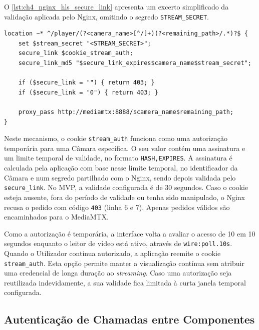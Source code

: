 O \autoref{lst:ch4_nginx_hls_secure_link} apresenta um excerto simplificado da validação aplicada pelo Nginx, omitindo o segredo \texttt{STREAM\_SECRET}.

\par\noindent\begin{minipage}{\linewidth}
\begin{lstlisting}[caption={Validação simplificada do acesso HLS no Nginx (nginx)},label={lst:ch4_nginx_hls_secure_link}]
location ~* ^/player/(?<camera_name>[^/]+)(?<remaining_path>/.*)?$ {
    set $stream_secret "<STREAM_SECRET>";
    secure_link $cookie_stream_auth;
    secure_link_md5 "$secure_link_expires$camera_name$stream_secret";

    if ($secure_link = "") { return 403; }
    if ($secure_link = "0") { return 403; }

    proxy_pass http://mediamtx:8888/$camera_name$remaining_path;
}
\end{lstlisting}
\end{minipage}

Neste mecanismo, o cookie \texttt{stream\_auth} funciona como uma autorização temporária para uma Câmara específica. O seu valor contém uma assinatura e um limite temporal de validade, no formato \texttt{HASH,EXPIRES}. A assinatura é calculada pela aplicação com base nesse limite temporal, no identificador da Câmara e num segredo partilhado com o Nginx, sendo depois validada pelo \texttt{secure\_link}. No \gls{MVP}, a validade configurada é de 30 segundos. Caso o cookie esteja ausente, fora do período de validade ou tenha sido manipulado, o Nginx recusa o pedido com código \texttt{403} (linha 6 e 7). Apenas pedidos válidos são encaminhados para o MediaMTX.

Como a autorização é temporária, a interface volta a avaliar o acesso de 10 em 10 segundos enquanto o leitor de vídeo está ativo, através de \texttt{wire:poll.10s}. Quando o Utilizador continua autorizado, a aplicação reemite o cookie \texttt{stream\_auth}. Esta opção permite manter a visualização contínua sem atribuir uma credencial de longa duração ao \textit{streaming}. Caso uma autorização seja reutilizada indevidamente, a sua validade fica limitada à curta janela temporal configurada.


\subsection{Autenticação de Chamadas entre Componentes}
\label{subsec:autenticacao_chamadas_entre_componentes}

